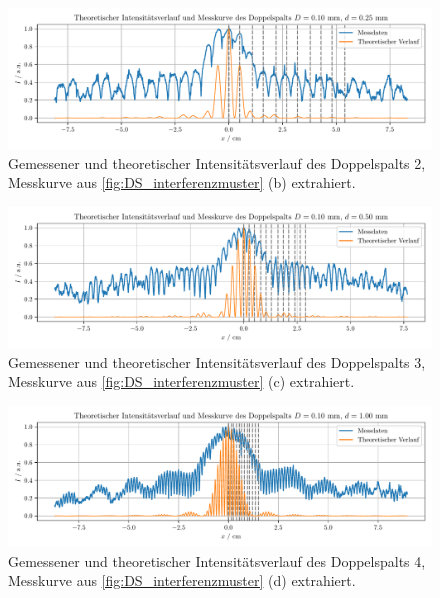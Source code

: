 \documentclass[ngerman]{scrartcl}
\begin{document}
\begin{figure}[H]
    \centering
    \begin{samepage}
        \includegraphics[width=\linewidth]{../python/plots/young_2.pdf}
        \caption[Intensitätskurve DS 2]{Gemessener und theoretischer Intensitätsverlauf des Doppelspalts 2, Messkurve aus \autoref{fig:DS_interferenzmuster} (b) extrahiert.}
        \label{fig:intensitaet_DS_2}
    \end{samepage}
\end{figure}
\begin{figure}[H]
    \centering
    \begin{samepage}
        \includegraphics[width=\linewidth]{../python/plots/young_3.pdf}
        \caption[Intensitätskurve DS 3]{Gemessener und theoretischer Intensitätsverlauf des Doppelspalts 3, Messkurve aus \autoref{fig:DS_interferenzmuster} (c) extrahiert.}
        \label{fig:intensitaet_DS_3}
    \end{samepage}
\end{figure}
\begin{figure}[H]
    \centering
    \begin{samepage}
        \includegraphics[width=\linewidth]{../python/plots/young_4.pdf}
        \caption[Intensitätskurve DS 4]{Gemessener und theoretischer Intensitätsverlauf des Doppelspalts 4, Messkurve aus \autoref{fig:DS_interferenzmuster} (d) extrahiert.}
        \label{fig:intensitaet_DS_4}
    \end{samepage}
\end{figure}
\end{document}
